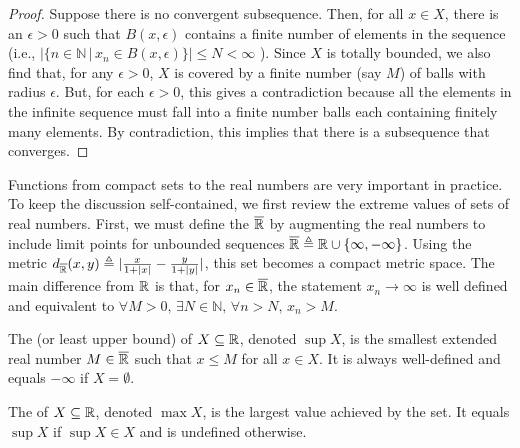 \begin{proof}
Suppose there is no convergent subsequence.
Then, for all $x\in X$, there is an $\epsilon >0$ such that $B(x,\epsilon)$ contains a finite number of elements in the sequence (i.e., $|\{n\in \mathbb{N}\,|\,x_n \in B(x,\epsilon)\}| \leq N<\infty$ ).
Since $X$ is totally bounded, we also find that, for any $\epsilon >0$, $X$ is covered by a finite number (say $M$) of balls with radius $\epsilon$.
But, for each $\epsilon >0$, this gives a contradiction because all the elements in the infinite sequence must fall into a finite number balls each containing finitely many elements.
By contradiction, this implies that there is a subsequence that converges.
\fi
\end{proof}

Functions from compact sets to the real numbers are very important in practice.
To keep the discussion self-contained, we first review the extreme values of sets of real numbers.
First, we must define the  $\overline{\mathbb{R}}$ by augmenting the real numbers to include limit points for unbounded sequences $\overline{\mathbb{R}} \triangleq \mathbb{R} \cup \{ \infty,-\infty\}$.
Using the metric $d_{\overline{\mathbb{R}}} (x,y) \triangleq |\frac{x}{1+|x|} - \frac{y}{1+|y|}|$, this set becomes a compact metric space.
The main difference from $\mathbb{R}$ is that, for  $x_n \in \overline{\mathbb{R}}$, the statement  $x_n \to \infty$ is well defined and equivalent to $\forall M>0, \, \exists N\in \mathbb{N}, \, \forall n>N, \, x_n > M$.
\begin{definition}
The  (or least upper bound) of $X\subseteq \mathbb{R}$, denoted $\sup X$, is the smallest extended real number $M \in \overline{\mathbb{R}}$ such that $x\leq M$ for all $x\in X$.
It is always well-defined and equals $-\infty$ if $X=\emptyset$.
\end{definition}

\begin{definition}
The  of $X\subseteq \mathbb{R}$, denoted $\max X$, is the largest value achieved by the set.
It equals $\sup X$ if $\sup X \in X$ and is undefined otherwise.
\end{definition}

